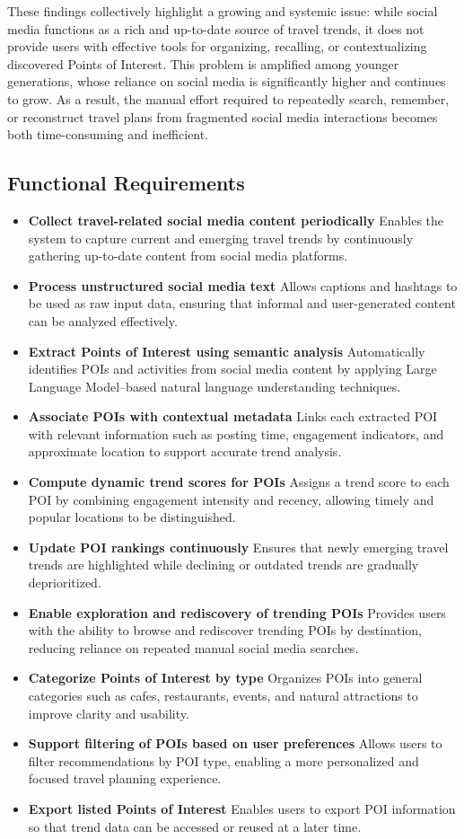 \documentclass[a4paper,12pt]{report}
\begin{document}
These findings collectively highlight a growing and systemic issue: while social media functions as a rich and up-to-date source of travel trends, it does not provide users with effective tools for organizing, recalling, or contextualizing discovered Points of Interest. This problem is amplified among younger generations, whose reliance on social media is significantly higher and continues to grow. As a result, the manual effort required to repeatedly search, remember, or reconstruct travel plans from fragmented social media interactions becomes both time-consuming and inefficient.

\subsection{Functional Requirements}

\begin{itemize}
\item \textbf{Collect travel-related social media content periodically}
Enables the system to capture current and emerging travel trends by continuously gathering up-to-date content from social media platforms.
\item \textbf{Process unstructured social media text}
Allows captions and hashtags to be used as raw input data, ensuring that informal and user-generated content can be analyzed effectively.
\item \textbf{Extract Points of Interest using semantic analysis}
Automatically identifies POIs and activities from social media content by applying Large Language Model–based natural language understanding techniques.
\item \textbf{Associate POIs with contextual metadata}
Links each extracted POI with relevant information such as posting time, engagement indicators, and approximate location to support accurate trend analysis.
\item \textbf{Compute dynamic trend scores for POIs}
Assigns a trend score to each POI by combining engagement intensity and recency, allowing timely and popular locations to be distinguished.
\item \textbf{Update POI rankings continuously}
Ensures that newly emerging travel trends are highlighted while declining or outdated trends are gradually deprioritized.
\item \textbf{Enable exploration and rediscovery of trending POIs}
Provides users with the ability to browse and rediscover trending POIs by destination, reducing reliance on repeated manual social media searches.
\item \textbf{Categorize Points of Interest by type}
Organizes POIs into general categories such as cafes, restaurants, events, and natural attractions to improve clarity and usability.
\item \textbf{Support filtering of POIs based on user preferences}
Allows users to filter recommendations by POI type, enabling a more personalized and focused travel planning experience.
\item \textbf{Export listed Points of Interest}
Enables users to export POI information so that trend data can be accessed or reused at a later time.
\end{itemize}
\end{document}
